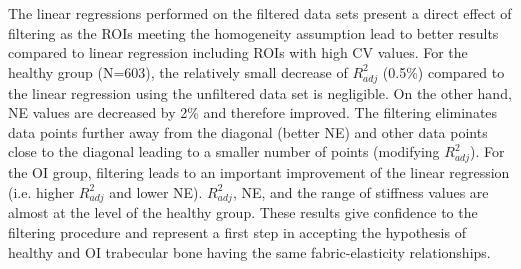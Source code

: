 \documentclass[a4paper,fleqn]{DC_ArtStyle}
\newcommand{\Add}[1]{{\color{blue}{#1}}}
\begin{document}
	The linear regressions performed on the filtered data sets present a direct effect of filtering as the ROIs meeting the homogeneity assumption lead to better results compared to linear regression including ROIs with high CV values. For the healthy group (N=603), the relatively small decrease of $R^2_{adj}$ (0.5\%) compared to the linear regression using the unfiltered data set is negligible. On the other hand, NE values are decreased by 2\% and therefore improved. The filtering eliminates data points further away from the diagonal (better NE) and other data points close to the diagonal leading to a smaller number of points (modifying $R^2_{adj}$). For the OI group, filtering leads to an important improvement of the linear regression (i.e. higher $R^2_{adj}$ and lower NE). $R^2_{adj}$, NE, and the range of stiffness values are almost at the level of the healthy group. These results give confidence to the filtering procedure and represent a first step in accepting the hypothesis of healthy and OI trabecular bone having the same fabric-elasticity relationships. \Add{Indeed, this confirms that filtering according to heterogeneity level allows to compare fabric-elasticity relationships of homogeneous ROIs for which the selected homogenisation procedure is valid.}\\
	
\end{document}
